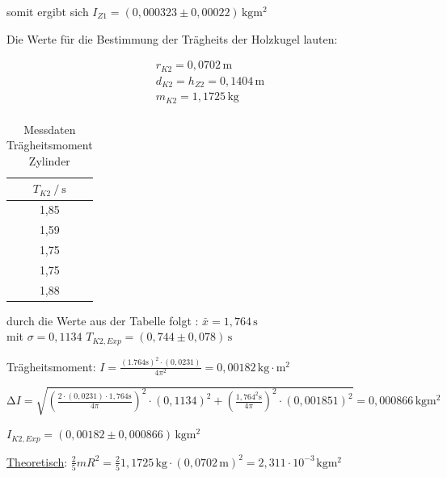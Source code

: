 \begin{center}
    somit ergibt sich \to $ I_{Z1} = (0,000323 \pm 0,00022)\,\unit{\kilo\gram\meter^2} $
\end{center}

\begin{flushleft}
    Die Werte für die Bestimmung der Trägheits der Holzkugel lauten:
\end{flushleft}

\begin{align*}
 r_{K2} = 0,0702\, \unit{\meter}  \\
 d_{K2} = h_{Z2} = 0,1404\, \unit{\meter}  \\
 m_{K2} = 1,1725\, \unit{\kilogram}  \\
\end{align*}


\begin{table}
    \centering
    \caption{Messdaten Trägheitsmoment Zylinder}
    \label{Tabelle4}
    \begin{tabular} {c}
        \toprule
        {$ T_{K2} \mathbin{/} \unit{\second} $} \\
        \midrule
        1,85 \\
        1,59 \\
        1,75 \\
        1,75 \\
        1,88 \\
        \bottomrule
    \end{tabular} 
\end{table}

\begin{center}
    durch die Werte aus der Tabelle folgt : \quad $ \bar{x} = 1,764\, \unit{\second} $ \\
    mit $  \sigma = 0,1134 $ \quad \to \quad $ T_{K2,Exp} = (0,744 \pm 0,078)\, \unit{\second}   $
    
    \vspace{0.3cm}
 
    Trägheitsmoment: $ I = \frac{(1.764 \unit{\second})^2 \cdot (0,0231) }{4\pi^2} = 0,00182\,\unit{\kilo\gram}\cdot\unit{\meter^2} $ \\

    \vspace{0.5cm}

    $ \increment I = \sqrt{ \left(\frac{2\cdot (0,0231) \cdot 1,764\unit{\second}}{4\pi} \right)^2 \cdot (0,1134)^2 + \left(\frac{1,764^2\unit{\second}}{4\pi} \right)^2 \cdot (0,001851)^2 } = 0,000866\,\unit{\kilogram\meter^2} $ \\

    \vspace{0.5cm}

    \underline{$ I_{K2, Exp} = (0,00182 \pm 0,000866)\,\unit{\kilogram\meter^2} $ }

    \vspace{0.5cm}

    \underline{Theoretisch}: $ \frac{2}{5}mR^2 = \frac{2}{5} 1,1725\, \unit{\kilogram} \cdot (0,0702 \,\unit{\meter})^2 = 2,311 \cdot 10^{-3\,} \unit{\kilogram\meter^2}  $
\end{center}


